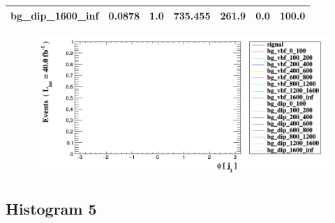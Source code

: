 \documentclass[a4paper, 10pt]{article}
\begin{document}
\begin{table}[H]
\begin{center}
\begin{tabular}{|m{23.0mm}|m{23.0mm}|m{18.0mm}|m{19.0mm}|m{19.0mm}|m{19.0mm}|m{19.0mm}|}
      \hline
      {\cellcolor{white}         bg\_dip\_1600\_inf}& {\cellcolor{white}         0.0878}& {\cellcolor{white}         1.0}& {\cellcolor{white}         735.455}& {\cellcolor{white}         261.9}& {\cellcolor{red}         0.0}& {\cellcolor{red}         100.0}\\
\hline
    \end{tabular}
  \end{center}
\end{table}

\begin{figure}[H]
  \begin{center}
    \includegraphics[scale=0.45]{selection_3.png}\\
\caption{   }
  \end{center}
\end{figure}
      \newpage
\subsection{ Histogram 5}
\end{document}
